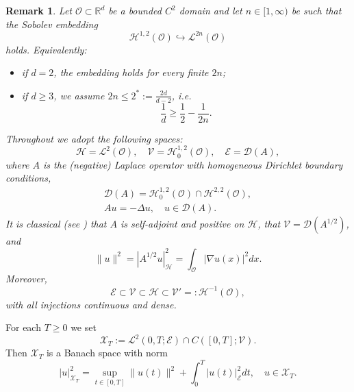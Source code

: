 \documentclass[10pt,a4paper]{amsart}
\numberwithin{equation}{section}
\newtheorem{remark}[theorem]{Remark}
\begin{document}
\begin{remark}\label{rem-1-spaces} \rm
Let $\mathcal{O} \subset \mathbb{R}^{d}$ be a bounded $C^{2}$ domain and let
$n \in [1, \infty)$ be such that the Sobolev embedding
\[
\mathcal{H}^{1,2}(\mathcal{O}) \hookrightarrow \mathcal{L}^{2n}(\mathcal{O})
\]
holds. Equivalently:
\begin{itemize}
\item if $d = 2$, the embedding holds for every finite $2n$;
\item if $d \ge 3$, we assume $2n \le 2^{\ast} := \frac{2d}{d-2}$, i.e.
\begin{equation}
\frac{1}{d} \geq \frac{1}{2} - \frac{1}{2n}.
\label{m_thm}
\end{equation}
\end{itemize}
Throughout we adopt the following spaces:
\[
\mathcal{H} = \mathcal{L}^{2}(\mathcal{O}), \quad
\mathcal{V} = \mathcal{H}_{0}^{1,2}(\mathcal{O}), \quad
\mathcal{E} = \mathcal{D}(A),
\]
where $A$ is the (negative) Laplace operator with homogeneous Dirichlet boundary
conditions,
\begin{equation} \label{1-1.1}
\begin{gathered}
\mathcal{D}(A) = \mathcal{H}_{0}^{1,2}(\mathcal{O})
\cap \mathcal{H}^{2,2}(\mathcal{O}),  \\
Au = -\Delta u, \quad u \in \mathcal{D}(A).
\end{gathered}
\end{equation}
It is classical (see \cite[Theorem 4.1.2, p.~79]{I.Vrabie}) that $A$ is
self-adjoint and positive on $\mathcal{H}$, that $\mathcal{V} = \mathcal{D}(A^{1/2})$,
and
\[
\|u\|^{2} = |A^{1/2}u|_{\mathcal{H}}^{2} = \int_{\mathcal{O}} |\nabla u(x)|^{2}  dx.
\]
Moreover,
\[
\mathcal{E} \subset \mathcal{V} \subset \mathcal{H} \subset \mathcal{V}'
=: \mathcal{H}^{-1}(\mathcal{O}),
\]
with all injections continuous and dense.
\end{remark}

For each $T \ge 0$ we set
\begin{equation}
\mathcal{X}_{T} := \mathcal{L}^{2}(0,T;\mathcal{E}) \cap C([0,T];\mathcal{V}).
\label{eqn-X_T}
\end{equation}
Then $\mathcal{X}_{T}$ is a Banach space with norm
\begin{equation}
|u|_{\mathcal{X}_{T}}^{2}
= \sup_{t \in [0,T]} \|u(t)\|^{2} + \int_{0}^{T} |u(t)|_{\mathcal{E}}^{2}  dt, \quad u \in \mathcal{X}_{T}.
\label{eqn-X_T-norm}
\end{equation}
\end{document}
